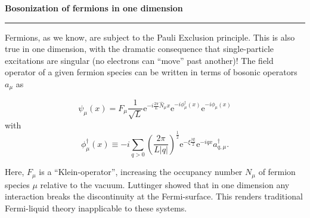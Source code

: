 

\begin{frame}
    \begin{block}{\color{white}\textbf{\Large{
                    Bosonization of fermions in one dimension
                }}}
        \vspace{-10pt}\rule{\textwidth}{0.5pt}
        \color{white}
        Fermions, as we know, are subject to the Pauli Exclusion principle.
        This is also true in one dimension, with the dramatic consequence that single-particle excitations are singular (no electrons can  ``move'' past another)!
        The field operator of a given fermion species can be written in terms of bosonic operators $a_\mu$ as
    \end{block}
    \vspace*{-10pt}
    \[ \psi_{\mu}(x) = F_{\mu} \frac{1}{\sqrt{L}}\mathrm{e}^{-i\frac{2\pi}{L}\hat{N}_{\mu}x}\mathrm{e}^{-i\phi_{\mu}^{\dagger}(x)}\mathrm{e}^{-i\phi_{\mu}(x)} \]
    with
    \[ \phi_{\mu}^{\dagger}(x) \equiv -i\sum_{q>0}\left (\frac{2\pi}{L|q|}\right )^{\frac12}\mathrm{e}^{-\xi\frac{|q|}{2}}\mathrm{e}^{-iqx}a_{q,\mu}^{\dagger}. \]

    \vspace*{-5pt}
    \begin{block}{}
        \color{white}
        Here, $F_\mu$ is a ``Klein-operator'', increasing the occupancy number $N
            _\mu$ of fermion species $\mu$ relative to the vacuum. Luttinger showed that in one dimension any interaction breaks the discontinuity at the Fermi-surface. This renders traditional Fermi-liquid theory inapplicable to these systems.
    \end{block}
\end{frame}